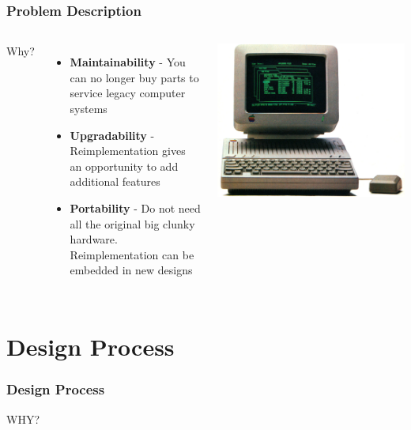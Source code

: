 \documentclass{beamer}
\newlength{\wideitemsep}
\let\olditem\item
\renewcommand{\item}{\setlength{\itemsep}{\wideitemsep}\olditem}
\begin{document}
\begin{frame}
    \frametitle{Problem Description}

    \begin{columns}[c]
            Why?
            \begin{itemize}
                \item<2-> \textbf{Maintainability} - You can no longer buy parts to service legacy computer systems
                \item<3-> \textbf{Upgradability} - Reimplementation gives an opportunity to add additional features
                \item<4-> \textbf{Portability} - Do not need all the original big clunky hardware. Reimplementation can
                    be embedded in new designs
            \end{itemize}

            \includegraphics[width=\textwidth]{../images/apple_2.jpg}
    \end{columns}
\end{frame}

\section{Design Process}
\begin{frame}
    \frametitle{Design Process}
    \begin{center}
        WHY?
    \end{center}
\end{frame}
\end{document}
